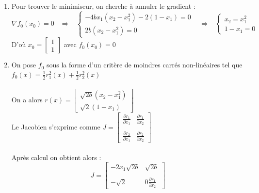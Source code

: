 \documentclass[a4paper, 10pt]{article}
\begin{document}
\begin{enumerate}
				\item{
					Pour trouver le minimiseur, on cherche à annuler le gradient :
					$$
						\nabla f_0(x_0)=0 \;\;\; \Rightarrow  \;\;\;
						\left\{
							\begin{array}{rl}
								-4bx_1(x_2-x_1^2)-2(1-x_1)= 0 \\
								2b(x_2-x_1^2) =0
							\end{array}
						\right. \;\;\; \Rightarrow \;\;\; \left\{
							\begin{array}{rl}
								x_2 = x_1^2 \\
								1-x_1 =0
							\end{array}
							\right.
					$$
					D'où $x_0= \left[ \begin{array}{c} 1 \\ 1  \end{array} \right]$ avec $f_0(x_0) = 0$
				}
				\item{
					On pose $f_0$ sous la forme d'un critère de moindres carrés non-linéaires tel que $f_0(x)=\frac{1}{2}r_1^2(x) + \frac{1}{2}r_2^2(x)$
					\\ \\
					On a alors $r(x) = \left[ \begin{array}{c} \sqrt{2b}(x_2-x_1^2) \\ \sqrt{2}(1-x_1) \end{array} \right]$
					\\Le Jacobien s'exprime comme $J=\left[ \begin{array}{cc} \frac{ \partial r_1}{\partial x_1} &  \frac{ \partial r_1}{\partial x_2} \\ \\ \frac{ \partial r_2}{\partial x_1} & \frac{ \partial r_2}{\partial x_2} \end{array} \right]$
					\\ \\ Après calcul on obtient alors :
					$$
					J=\left[
					\begin{array}{cc}
						-2x_1\sqrt{2b} & \sqrt{2b} 
						\\ \\
						-\sqrt{2} & 0 \frac{ \partial r_1}{\partial x_2} 
					\end{array} \right]
					$$
					
				}
			\end{enumerate}
\end{document}
